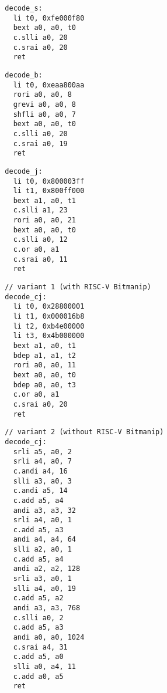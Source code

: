 \begin{multicols}{2}
\begin{minipage}{\linewidth}
\begin{verbatim}
  decode_s:
    li t0, 0xfe000f80
    bext a0, a0, t0
    c.slli a0, 20
    c.srai a0, 20
    ret
\end{verbatim}
\end{minipage}

\begin{minipage}{\linewidth}
\begin{verbatim}
  decode_b:
    li t0, 0xeaa800aa
    rori a0, a0, 8
    grevi a0, a0, 8
    shfli a0, a0, 7
    bext a0, a0, t0
    c.slli a0, 20
    c.srai a0, 19
    ret
\end{verbatim}
\end{minipage}

\begin{minipage}{\linewidth}
\begin{verbatim}
  decode_j:
    li t0, 0x800003ff
    li t1, 0x800ff000
    bext a1, a0, t1
    c.slli a1, 23
    rori a0, a0, 21
    bext a0, a0, t0
    c.slli a0, 12
    c.or a0, a1
    c.srai a0, 11
    ret
\end{verbatim}
\end{minipage}

\begin{minipage}{\linewidth}
\begin{verbatim}
  // variant 1 (with RISC-V Bitmanip)
  decode_cj:
    li t0, 0x28800001
    li t1, 0x000016b8
    li t2, 0xb4e00000
    li t3, 0x4b000000
    bext a1, a0, t1
    bdep a1, a1, t2
    rori a0, a0, 11
    bext a0, a0, t0
    bdep a0, a0, t3
    c.or a0, a1
    c.srai a0, 20
    ret
\end{verbatim}
\end{minipage}

\begin{minipage}{\linewidth}
\begin{verbatim}
  // variant 2 (without RISC-V Bitmanip)
  decode_cj:
    srli a5, a0, 2
    srli a4, a0, 7
    c.andi a4, 16
    slli a3, a0, 3
    c.andi a5, 14
    c.add a5, a4
    andi a3, a3, 32
    srli a4, a0, 1
    c.add a5, a3
    andi a4, a4, 64
    slli a2, a0, 1
    c.add a5, a4
    andi a2, a2, 128
    srli a3, a0, 1
    slli a4, a0, 19
    c.add a5, a2
    andi a3, a3, 768
    c.slli a0, 2
    c.add a5, a3
    andi a0, a0, 1024
    c.srai a4, 31
    c.add a5, a0
    slli a0, a4, 11
    c.add a0, a5
    ret
\end{verbatim}
\end{minipage}
\end{multicols}

